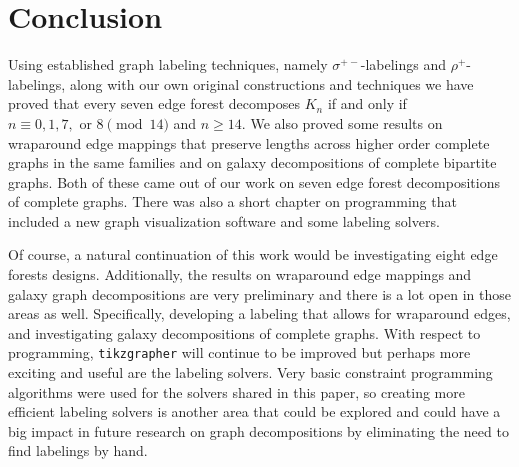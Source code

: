 \chapter{Conclusion}
\label{conclusion_chapter}

Using established graph labeling techniques, namely $\sigma^{+-}$-labelings and $\rho^{+}$-labelings, along with our own original constructions and techniques we have proved that every seven edge forest decomposes $K_{n}$ if and only if $n\equiv 0,1,7,\text{ or }8\pmod{14}$ and $n\geq 14$. We also proved some results on wraparound edge mappings that preserve lengths across higher order complete graphs in the same families and on galaxy decompositions of complete bipartite graphs. Both of these came out of our work on seven edge forest decompositions of complete graphs. There was also a short chapter on programming that included a new graph visualization software and some labeling solvers.

Of course, a natural continuation of this work would be investigating eight edge forests designs. Additionally, the results on wraparound edge mappings and galaxy graph decompositions are very preliminary and there is a lot open in those areas as well. Specifically, developing a labeling that allows for wraparound edges, and investigating galaxy decompositions of complete graphs. With respect to programming, \verb|tikzgrapher| will continue to be improved but perhaps more exciting and useful are the labeling solvers. Very basic constraint programming algorithms were used for the solvers shared in this paper, so creating more efficient labeling solvers is another area that could be explored and could have a big impact in future research on graph decompositions by eliminating the need to find labelings by hand.
